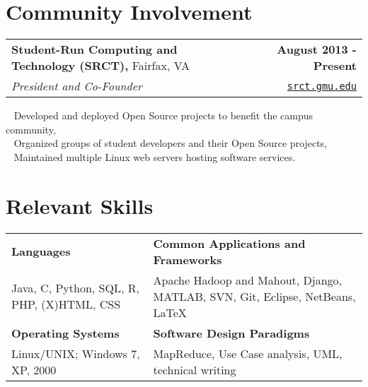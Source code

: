 \documentclass[letterpaper]{article}
\newcommand{\detail}{\indent\textbullet ~ }
\begin{document}
%


  \section{Community Involvement}
  \noindent
  \begin{tabularx}{\textwidth}{@{}X r@{}}
    \textbf{Student-Run Computing and Technology (SRCT),} Fairfax, VA & \textbf{August 2013 - Present} \\
    \emph{President and Co-Founder} & \texttt{\href{srct.gmu.edu}{srct.gmu.edu}} \\[0.2cm]
  \end{tabularx}

  \detail Developed and deployed Open Source projects to benefit the campus community,\\
  \detail Organized groups of student developers and their Open Source projects,\\
  \detail Maintained multiple Linux web servers hosting software services.\\


  \section{Relevant Skills}
  \noindent
  \begin{tabularx}{\textwidth}{@{}X X@{}}
    \textbf{Languages}                                    &  \textbf{Common Applications and Frameworks} \\
    Java, C, Python, SQL, R, PHP, (X)HTML, CSS          &  Apache Hadoop and Mahout, Django, MATLAB, SVN, Git, Eclipse, NetBeans, \LaTeX \\[0.2cm]
    \textbf{Operating Systems}                            &  \textbf{Software Design Paradigms} \\
    Linux/UNIX; Windows 7, XP, 2000                       &  MapReduce, Use Case analysis, UML, technical writing
  \end{tabularx}


\end{document}
